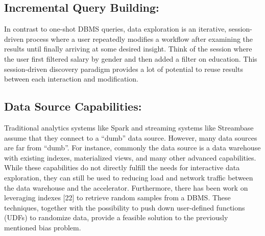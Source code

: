 \documentclass[12pt,letterpaper, onecolumn]{exam}
\begin{document}
    \subsection{Incremental Query Building:}
     In contrast to one-shot DBMS queries, data exploration is an iterative, session-driven process where a user repeatedly modifies a workflow after examining the results until finally arriving at some desired insight. Think of the session where the user first filtered salary by gender and then added a filter on education. This session-driven discovery paradigm provides a lot of potential to reuse results between each interaction and modification.
     
     \subsection{Data Source Capabilities:} 
     Traditional analytics systems like Spark and streaming systems like Streambase assume that they connect to a “dumb” data source. However, many data sources are far from “dumb”. For instance, commonly the data source is a data warehouse with existing indexes, materialized views, and many other advanced capabilities. While these capabilities do not directly fulfill the needs for interactive data exploration, they can still be used to reducing load and network traffic between the data warehouse and the accelerator. Furthermore, there has been work on leveraging indexes [22] to retrieve random samples from a DBMS. These techniques, together with the possibility to push down user-defined functions (UDFs) to randomize data, provide a feasible solution to the previously mentioned bias problem.
     
\end{document}

